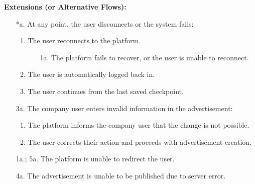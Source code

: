 \begin{itemize}[label={[\textbf{UC}]}, align=left, leftmargin=*]
    \textbf{Extensions (or Alternative Flows):} 
    \begin{enumerate}[label=\arabic*.]
        \item[*a.] At any point, the user disconnects or the system fails:
            \begin{enumerate}[label=\arabic*.]
                \item The user reconnects to the platform.
                    \begin{enumerate}[label=\alph*.]
                        \item[1a.] The platform fails to recover, or the user is unable to reconnect.
                    \end{enumerate}
                 \item The user is automatically logged back in.
                 \item The user continues from the last saved checkpoint.
            \end{enumerate}
        
        \item[3a.] The company user enters invalid information in the advertisement:
            \begin{enumerate}[label=\arabic*.]
                \item The platform informs the company user that the change is not possible.
                \item The user corrects their action and proceeds with advertisement creation.
            \end{enumerate}
        \item[1a.; 5a.] The platform is unable to redirect the user.
        \item[4a.] The advertisement is unable to be published due to server error.
        \end{enumerate}
     

\end{itemize}
